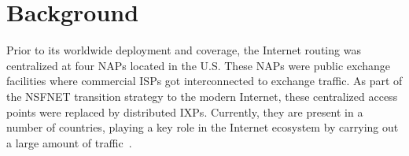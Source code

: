 \documentclass[12pt]{article}
\begin{document}






\section{Background}
\label{sec:background}
Prior to its worldwide deployment and coverage, the Internet routing was centralized at four NAPs located in the U.S. These NAPs were public exchange facilities where commercial ISPs got interconnected to exchange traffic. As part of the NSFNET transition strategy to the modern Internet, these centralized access points were replaced by distributed IXPs. Currently, they are present in a number of countries, playing a key role in the Internet ecosystem by carrying out a large amount of traffic~\cite{chatzis2013importance}. 
\end{document}
